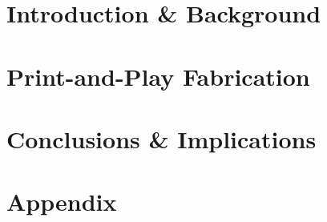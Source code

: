 \documentclass[ oneside,openright,titlepage,numbers=noenddot,%
                headinclude,footinclude,cleardoublepage=empty,abstract=on,
                BCOR=5mm,paper=a4,fontsize=11pt
                ]{scrreprt}
\begin{document}
	\frenchspacing
	\raggedbottom
	\pagestyle{plain}

	
	
	\cleardoublepage
	\cleardoublepage
	\cleardoublepage
	\cleardoublepage
	\cleardoublepage
	\cleardoublepage
	
	\cleardoublepage
	\pagestyle{scrheadings}
	\cleardoublepage
	\part{Introduction \& Background}
		\label{pt:background}
			
		\cleardoublepage
	\part{Print-and-Play Fabrication} 
		\label{pt:print-and-play}
	\part{Conclusions \& Implications} 
		\label{pt:implications}

	\cleardoublepage
	\part{Appendix}
	\cleardoublepage
	\cleardoublepage
\end{document}
